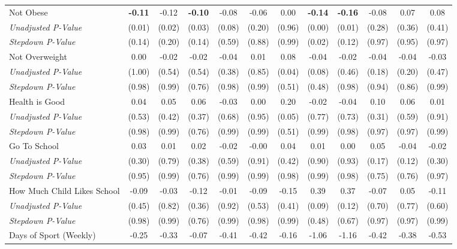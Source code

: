 \begin{tabular}{l c c c c c c c c c c c}
Not Obese & \textbf{ -0.11 } & -0.12 & \textbf{ -0.10 } & -0.08 & -0.06 & 0.00 & \textbf{ -0.14 } & \textbf{ -0.16 } & -0.08 & 0.07 & 0.08 \\
\quad \textit{Unadjusted P-Value} & (0.01) & (0.02) & (0.03) & (0.08) & (0.20) & (0.96) & (0.00) & (0.01) & (0.28) & (0.36) & (0.41) \\
\quad \textit{Stepdown P-Value} & (0.14) & (0.20) & (0.14) & (0.59) & (0.88) & (0.99) & (0.02) & (0.12) & (0.97) & (0.95) & (0.97) \\
Not Overweight & 0.00 & -0.02 & -0.02 & -0.04 & 0.01 & 0.08 & -0.04 & -0.02 & -0.04 & -0.04 & -0.03 \\
\quad \textit{Unadjusted P-Value} & (1.00) & (0.54) & (0.54) & (0.38) & (0.85) & (0.04) & (0.08) & (0.46) & (0.18) & (0.20) & (0.47) \\
\quad \textit{Stepdown P-Value} & (0.98) & (0.99) & (0.76) & (0.98) & (0.99) & (0.51) & (0.48) & (0.98) & (0.94) & (0.86) & (0.99) \\
Health is Good & 0.04 & 0.05 & 0.06 & -0.03 & 0.00 & 0.20 & -0.02 & -0.04 & 0.10 & 0.06 & 0.01 \\
\quad \textit{Unadjusted P-Value} & (0.53) & (0.42) & (0.37) & (0.68) & (0.95) & (0.05) & (0.77) & (0.73) & (0.31) & (0.59) & (0.91) \\
\quad \textit{Stepdown P-Value} & (0.98) & (0.99) & (0.76) & (0.99) & (0.99) & (0.51) & (0.99) & (0.98) & (0.97) & (0.97) & (0.99) \\
Go To School & 0.03 & 0.01 & 0.02 & -0.02 & -0.00 & 0.04 & 0.01 & 0.00 & 0.05 & -0.04 & -0.02 \\
\quad \textit{Unadjusted P-Value} & (0.30) & (0.79) & (0.38) & (0.59) & (0.91) & (0.42) & (0.90) & (0.93) & (0.17) & (0.12) & (0.30) \\
\quad \textit{Stepdown P-Value} & (0.95) & (0.99) & (0.76) & (0.99) & (0.99) & (0.98) & (0.99) & (0.98) & (0.75) & (0.76) & (0.97) \\
How Much Child Likes School & -0.09 & -0.03 & -0.12 & -0.01 & -0.09 & -0.15 & 0.39 & 0.37 & -0.07 & 0.05 & -0.11 \\
\quad \textit{Unadjusted P-Value} & (0.45) & (0.82) & (0.36) & (0.92) & (0.53) & (0.41) & (0.09) & (0.12) & (0.70) & (0.77) & (0.60) \\
\quad \textit{Stepdown P-Value} & (0.98) & (0.99) & (0.76) & (0.99) & (0.98) & (0.99) & (0.48) & (0.67) & (0.97) & (0.97) & (0.99) \\
Days of Sport (Weekly) & -0.25 & -0.33 & -0.07 & -0.41 & -0.42 & -0.16 & -1.06 & -1.16 & -0.42 & -0.38 & -0.53 \\

\end{tabular}
